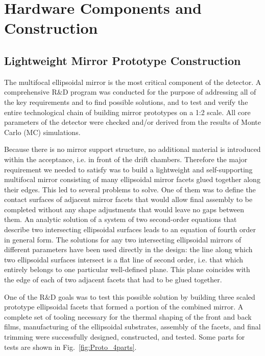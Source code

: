 \section{Hardware Components and Construction}

\subsection{Lightweight Mirror Prototype Construction}

The multifocal ellipsoidal mirror is the most critical component of the detector. A comprehensive R$\&$D
program was conducted for the purpose of addressing all of the key requirements and to find possible solutions,
and to test and verify the entire technological chain of building mirror prototypes on a 1:2 scale. All core
parameters of the detector were checked and/or derived from the results of Monte Carlo (MC) simulations.

Because there is no mirror support structure, no additional material is introduced  within the acceptance, i.e. in
front of the drift chambers. Therefore the major requirement we needed to satisfy was to build a lightweight
and self-supporting multifocal mirror consisting of many ellipsoidal mirror facets glued together along their
edges. This led to several problems to solve. One of them was to define the contact surfaces of adjacent mirror
facets that would allow final assembly to be completed without any shape adjustments that would leave no gaps
between them. An analytic solution of a system of two second-order equations that describe two intersecting
ellipsoidal surfaces leads to an equation of fourth order in general form. The solutions for any two intersecting
ellipsoidal mirrors of different parameters have been used directly in the design: the line along which two
ellipsoidal surfaces intersect is a flat line of second order, i.e. that which entirely belongs to one particular
well-defined plane. This plane coincides with the edge of each of two adjacent facets that had to be glued
together.

One of the R$\&$D goals was to test this possible solution by building three scaled prototype ellipsoidal facets
that formed a portion of the combined mirror. A complete set of tooling necessary for the thermal shaping of
the front and back films, manufacturing of the ellipsoidal substrates, assembly of the facets, and final trimming
were successfully designed, constructed, and tested. Some parts for tests are shown in
Fig.~\ref{fig:Proto_4parts}.

